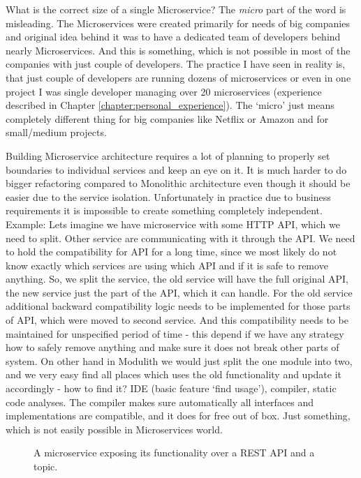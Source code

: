 What is the correct size of a single Microservice? The \textit{micro} part of the word is misleading. The Microservices were created primarily for needs of big companies and original idea behind it was to have a dedicated team of developers behind nearly Microservices. And this is something, which is not possible in most of the companies with just couple of developers. The practice I have seen in reality is, that just couple of developers are running dozens of microservices or even in one project I was single developer managing over 20 microservices (experience described in Chapter \ref{chapter:personal_experience}). The `micro' just means completely different thing for big companies like Netflix or Amazon and for small/medium projects.

Building Microservice architecture requires a lot of planning to properly set boundaries to individual services and keep an eye on it. It is much harder to do bigger refactoring compared to Monolithic architecture even though it should be easier due to the service isolation. Unfortunately in practice due to business requirements it is impossible to create something completely independent. Example: Lets imagine we have microservice with some HTTP API, which we need to split. Other service are communicating with it through the API. We need to hold the compatibility for API for a long time, since we most likely do not know exactly which services are using which API and if it is safe to remove anything. So, we split the service, the old service will have the full original API, the new service just the part of the API, which it can handle. For the old service additional backward compatibility logic needs to be implemented for those parts of API, which were moved to second service. And this compatibility needs to be maintained for unspecified period of time - this depend if we have any strategy how to safely remove anything and make sure it does not break other parts of system. On other hand in Modulith we would just split the one module into two, and we very easy find all places which uses the old functionality and update it accordingly - how to find it? IDE (basic feature `find usage'), compiler, static code analyses. The compiler makes sure automatically all interfaces and implementations are compatible, and it does for free out of box. Just something, which is not easily possible in Microservices world.


\begin{figure}
    \centering
    
    \caption{A microservice exposing its functionality over a REST API and a topic. \cite{BUILDING_MS_WHAT_ARE}\label{img:microservices_basic}}
\end{figure}



